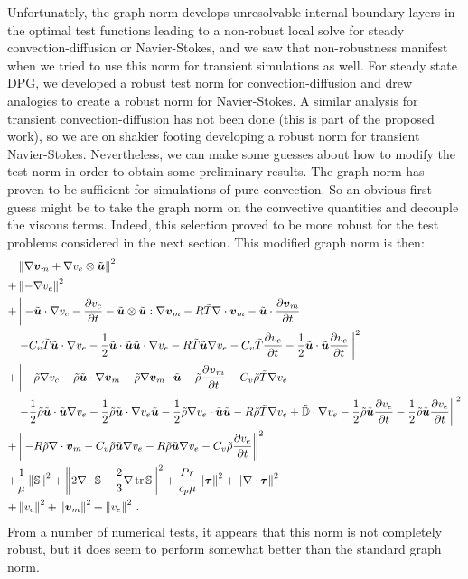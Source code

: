\documentclass[Proposal.tex]{subfiles}
\begin{document}
Unfortunately, the graph norm develops unresolvable internal boundary layers in the optimal test functions leading to a non-robust
local solve for steady convection-diffusion or Navier-Stokes,
and we saw that non-robustness manifest when we tried to use this norm for transient simulations as well.
For steady state DPG, we developed a robust test norm for convection-diffusion and drew analogies to create 
a robust norm for Navier-Stokes.
A similar analysis for transient convection-diffusion has not been done (this is part of the proposed work), 
so we are on shakier footing developing a robust norm for transient Navier-Stokes.
Nevertheless, we can make some guesses about how to modify the test norm in order to obtain some preliminary results.
The graph norm has proven to be sufficient for simulations of pure convection. 
So an obvious first guess might be to take the graph norm on the convective quantities and decouple the viscous terms.
Indeed, this selection proved to be more robust for the test problems considered in the next section.
This modified graph norm is then:
\begin{equation}
\begin{aligned}
&\left\| \nabla\boldsymbol v_m+\nabla v_e\otimes\tilde{\boldsymbol u} \right\|^2\\
+&\left\| -\nabla v_e \right\|^2\\
+&\left\|
-\tilde{\boldsymbol u}\cdot\nabla v_c-\frac{\partial v_c}{\partial t}-\tilde{\boldsymbol u}\otimes\tilde{\boldsymbol u}:\nabla\boldsymbol v_m
-R\tilde T\nabla\cdot\boldsymbol v_m-\tilde{\boldsymbol u}\cdot\frac{\partial\boldsymbol v_m}{\partial t}\right.\\
&\left.-C_v\tilde T\tilde{\boldsymbol u}\cdot\nabla v_e-\frac{1}{2}\tilde{\boldsymbol u}\cdot\tilde{\boldsymbol u}\tilde{\boldsymbol u}\cdot\nabla v_e
-R\tilde T\tilde{\boldsymbol u}\nabla v_e
-C_v\tilde T\frac{\partial v_e}{\partial t}-\frac{1}{2}\tilde{\boldsymbol u}\cdot\tilde{\boldsymbol u}\frac{\partial v_e}{\partial t}
\right\|^2\\
+&\left\|
-\tilde\rho\nabla v_c
-\tilde\rho\tilde{\boldsymbol u}\cdot\nabla\boldsymbol v_m-\tilde\rho\nabla\boldsymbol v_m\cdot\tilde{\boldsymbol u}
-\tilde\rho\frac{\partial\boldsymbol v_m}{\partial t}
-C_v\tilde\rho\tilde T\nabla v_e\right.\\
&\left.
-\frac{1}{2}\tilde\rho\tilde{\boldsymbol u}\cdot\tilde{\boldsymbol u}\nabla v_e
-\frac{1}{2}\tilde\rho\tilde{\boldsymbol u}\cdot\nabla v_e\tilde{\boldsymbol u}
-\frac{1}{2}\tilde\rho\nabla v_e\cdot\tilde{\boldsymbol u}\tilde{\boldsymbol u}
-R\tilde\rho\tilde T\nabla v_e
+\tilde{\mathbb{D}}\cdot\nabla v_e
-\frac{1}{2}\tilde\rho\tilde{\boldsymbol u}\frac{\partial v_e}{\partial t}
-\frac{1}{2}\tilde\rho\tilde{\boldsymbol u}\frac{\partial v_e}{\partial t}
\right\|^2\\
+&\left\|
-R\tilde\rho\nabla\cdot\boldsymbol v_m
-C_v\tilde\rho\tilde{\boldsymbol u}\nabla v_e
-R\tilde\rho\tilde{\boldsymbol u}\nabla v_e
-C_v\tilde\rho\frac{\partial v_e}{\partial t}
\right\|^2\\
+&\frac{1}{\mu}\left\| \mathbb{S} \right\|^2
+\left\| 2\nabla\cdot\mathbb{S}-\frac{2}{3}\nabla\operatorname*{tr}{\mathbb{S}} \right\|^2
+\frac{Pr}{c_p\mu}\left\| \boldsymbol\tau \right\|^2
+\left\| \nabla\cdot\boldsymbol\tau \right\|^2\\
+&\left\| v_c \right\|^2
+\left\| \boldsymbol v_m \right\|^2
+\left\| v_e \right\|^2
\,.
\end{aligned}
\end{equation}
From a number of numerical tests, it appears that this norm is not completely robust, but it does seem to perform somewhat better
than the standard graph norm.
\end{document}

